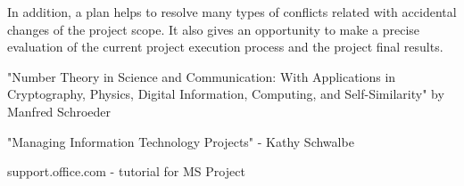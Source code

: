 \documentclass[english]{article}
\begin{document}
In addition, a plan helps to resolve many types of conflicts related with accidental changes of the project scope. It also gives an opportunity to make a precise evaluation of the current project execution process and the project final results.

\begin{thebibliography}{1}

    "Number Theory in Science and Communication: With Applications in Cryptography, Physics, Digital Information, Computing, and Self-Similarity" by Manfred Schroeder
   
    "Managing Information Technology Projects" - Kathy Schwalbe
   
    support.office.com - tutorial for MS Project

  \end{thebibliography}
\end{document}
